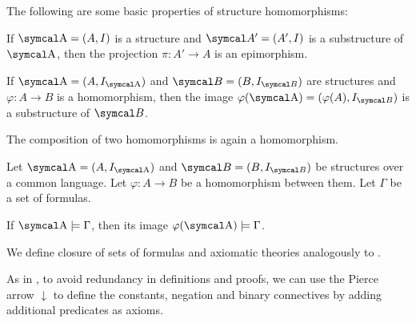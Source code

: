 \begin{proposition}\label{thm:first_order_homomorphism_properties}
  The following are some basic properties of structure homomorphisms:
  \begin{defenum}
     If \( \CA = (A, I) \) is a structure and \( \Cal{A'} = (A', I) \) is a substructure of \( \CA \), then the projection \( \pi: A' \to A \) is an epimorphism.

     If \( \CA = (A, I_{\CA}) \) and \( \Cal{B} = (B, I_{\Cal{B}}) \) are structures and \( \varphi: A \to B \) is a homomorphism, then the image \( \varphi(\CA) = (\varphi(A), I_{\Cal{B}}) \) is a substructure of \( \Cal{B} \).

     The composition of two homomorphisms is again a homomorphism.
  \end{defenum}
\end{proposition}

\begin{proposition}\label{thm:first_order_homomorphism_preserves_models}\cite[definition 23.8]{OpenLogic20201202}
  Let \( \CA = (A, I_{\CA}) \) and \( \Cal{B} = (B, I_{\Cal{B}}) \) be structures over a common language. Let \( \varphi: A \to B \) be a homomorphism between them. Let \( \Gamma \) be a set of formulas.

  If \( \CA \models \Gamma \), then its image \( \varphi(\CA) \models \Gamma \).
\end{proposition}

\begin{definition}\label{def:first_order_theory}
  We define closure of sets of formulas and axiomatic theories analogously to .
\end{definition}

\begin{remark}\label{remark:minimal_first_order_language}
  As in , to avoid redundancy in definitions and proofs, we can use the Pierce arrow \( \downarrow \) to define the constants, negation and binary connectives by adding additional predicates as axioms.
\end{remark}

